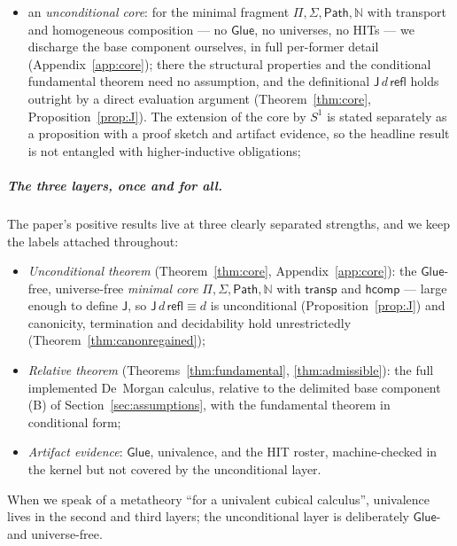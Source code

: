 \documentclass{lmcs}
\newcommand{\transp}{\mathsf{transp}}
\newcommand{\hcomp}{\mathsf{hcomp}}
\newcommand{\refl}{\mathsf{refl}}
\newcommand{\J}{\mathsf{J}}
\newcommand{\Glue}{\mathsf{Glue}}
\renewcommand{\conv}{\equiv}
\newcommand{\Path}{\mathsf{Path}}
\begin{document}
\begin{itemize}
  unrestricted argument exhibited exactly
  (Remark~\ref{rem:conversiongap}); and its repair on the core: an
  \emph{endpoint-blind hereditary-termination invariant} whose
  fundamental theorem tolerates unrestricted conversions, regaining
  canonicity, termination and decidability there
  (Theorem~\ref{thm:canonregained},
  Appendix~\ref{app:htrepair}).  The base-rule cases are inherited
  as an explicitly delimited \emph{base component}
  (Section~\ref{sec:assumptions});
\item an \emph{unconditional core}: for the minimal fragment
  $\Pi, \Sigma, \Path, \mathbb{N}$ with transport and homogeneous
  composition --- no $\Glue$, no universes, no HITs --- we discharge
  the base component ourselves, in full per-former detail
  (Appendix~\ref{app:core}); there the structural properties and the
  conditional fundamental theorem need no assumption, and the
  definitional $\J\,d\,\refl$ holds outright by a direct evaluation
  argument (Theorem~\ref{thm:core},
  Proposition~\ref{prop:J}).  The extension of the core by $S^1$ is
  stated separately as a proposition with a proof sketch and
  artifact evidence, so the headline result is not entangled with
  higher-inductive obligations;
\end{itemize}

\subparagraph*{The three layers, once and for all.}  The paper's
positive results live at three clearly separated strengths, and we
keep the labels attached throughout:
\begin{itemize}
\item \emph{Unconditional theorem} (Theorem~\ref{thm:core},
  Appendix~\ref{app:core}): the $\Glue$-free, universe-free
  \emph{minimal core} $\Pi, \Sigma, \Path, \mathbb{N}$ with
  $\transp$ and $\hcomp$ --- large enough to define $\J$, so
  $\J\,d\,\refl \conv d$ is unconditional
  (Proposition~\ref{prop:J}) and canonicity, termination and
  decidability hold unrestrictedly
  (Theorem~\ref{thm:canonregained});
\item \emph{Relative theorem} (Theorems~\ref{thm:fundamental},
  \ref{thm:admissible}): the full implemented De~Morgan calculus,
  relative to the delimited base component (B) of
  Section~\ref{sec:assumptions}, with the fundamental theorem in
  conditional form;
\item \emph{Artifact evidence}: $\Glue$, univalence, and the HIT
  roster, machine-checked in the kernel but not covered by the
  unconditional layer.
\end{itemize}
When we speak of a metatheory ``for a univalent cubical calculus'',
univalence lives in the second and third layers; the unconditional
layer is deliberately $\Glue$- and universe-free.
\end{document}
